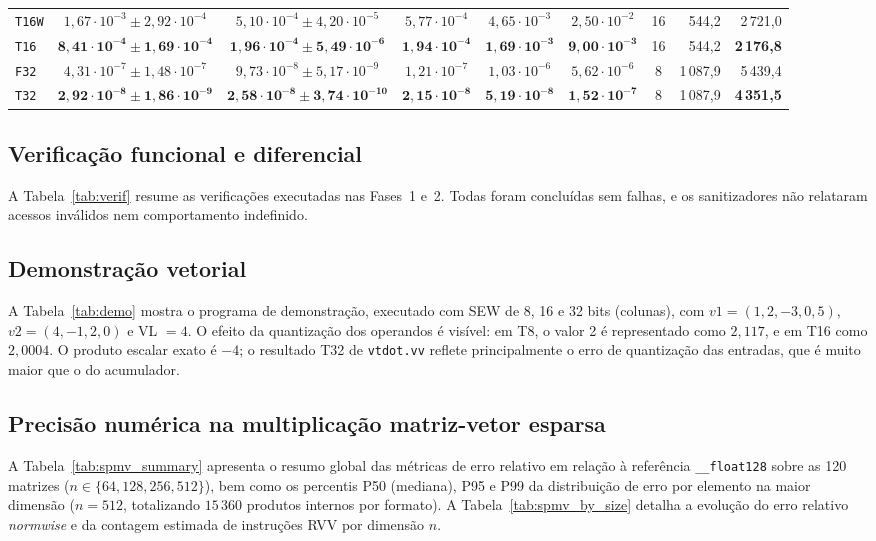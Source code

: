 \documentclass[journal]{IEEEtran}
\begin{document}
\begin{table}[!t]
\begin{tabular}{l c c c c c c r r}
\texttt{T16W}    & $1{,}67\cdot 10^{-3} \pm 2{,}92\cdot 10^{-4}$ & $5{,}10\cdot 10^{-4} \pm 4{,}20\cdot 10^{-5}$ & $5{,}77\cdot 10^{-4}$ & $4{,}65\cdot 10^{-3}$ & $2{,}50\cdot 10^{-2}$ & 16 &   544,2 & 2\,721,0 \\
\texttt{T16}     & $\mathbf{8{,}41\cdot 10^{-4} \pm 1{,}69\cdot 10^{-4}}$ & $\mathbf{1{,}96\cdot 10^{-4} \pm 5{,}49\cdot 10^{-6}}$ & $\mathbf{1{,}94\cdot 10^{-4}}$ & $\mathbf{1{,}69\cdot 10^{-3}}$ & $\mathbf{9{,}00\cdot 10^{-3}}$ & 16 & 544,2 & \textbf{2\,176,8} \\
\hline
\texttt{F32}     & $4{,}31\cdot 10^{-7} \pm 1{,}48\cdot 10^{-7}$ & $9{,}73\cdot 10^{-8} \pm 5{,}17\cdot 10^{-9}$ & $1{,}21\cdot 10^{-7}$ & $1{,}03\cdot 10^{-6}$ & $5{,}62\cdot 10^{-6}$ &  8 & 1\,087,9 & 5\,439,4 \\
\texttt{T32}     & $\mathbf{2{,}92\cdot 10^{-8} \pm 1{,}86\cdot 10^{-9}}$ & $\mathbf{2{,}58\cdot 10^{-8} \pm 3{,}74\cdot 10^{-10}}$ & $\mathbf{2{,}15\cdot 10^{-8}}$ & $\mathbf{5{,}19\cdot 10^{-8}}$ & $\mathbf{1{,}52\cdot 10^{-7}}$ &  8 & 1\,087,9 & \textbf{4\,351,5} \\
\hline
\end{tabular}
\end{table}

\subsection{Verificação funcional e diferencial}
A Tabela~\ref{tab:verif} resume as verificações executadas nas Fases~1 e~2.
Todas foram concluídas sem falhas, e os sanitizadores não relataram acessos
inválidos nem comportamento indefinido.

\subsection{Demonstração vetorial}
A Tabela~\ref{tab:demo} mostra o programa de demonstração, executado com
SEW de 8, 16 e 32 bits (colunas), com
$v1 = (1, 2, -3, 0{,}5)$, $v2 = (4, -1, 2, 0)$ e VL $=4$. O efeito da
quantização dos operandos é visível: em T8, o valor 2 é representado como
$2{,}117$, e em T16 como $2{,}0004$. O produto escalar exato é $-4$; o
resultado T32 de \texttt{vtdot.vv} reflete principalmente o erro de
quantização das entradas, que é muito maior que o do acumulador.

\subsection{Precisão numérica na multiplicação matriz-vetor esparsa}
A Tabela~\ref{tab:spmv_summary} apresenta o resumo global das métricas de erro
relativo em relação à referência \texttt{\_\_float128} sobre as 120 matrizes
($n \in \{64, 128, 256, 512\}$), bem como os percentis P50 (mediana), P95 e P99
da distribuição de erro por elemento na maior dimensão ($n=512$, totalizando
$15\,360$ produtos internos por formato). A Tabela~\ref{tab:spmv_by_size}
detalha a evolução do erro relativo \emph{normwise} e da contagem estimada de
instruções RVV por dimensão $n$.
\end{document}
